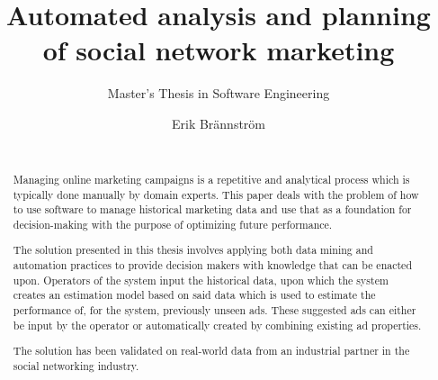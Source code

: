 \documentclass{sig-alternate}
\begin{document}
\title{Automated analysis and planning of social network marketing}
\subtitle{Master's Thesis in Software Engineering}

\author{
\alignauthor
Erik Brännström\\
       \\
}

\maketitle

\begin{abstract}
Managing online marketing campaigns is a repetitive and analytical process which is typically done manually by domain experts. This paper deals with the problem of how to use software to manage historical marketing data and use that as a foundation for decision-making with the purpose of optimizing future performance.

The solution presented in this thesis involves applying both data mining and automation practices to provide decision makers with knowledge that can be enacted upon. Operators of the system input the historical data, upon which the system creates an estimation model based on said data which is used to estimate the performance of, for the system, previously unseen ads. These suggested ads can either be input by the operator or automatically created by combining existing ad properties.

The solution has been validated on real-world data from an industrial partner in the social networking industry.

\end{abstract}



\end{document}
